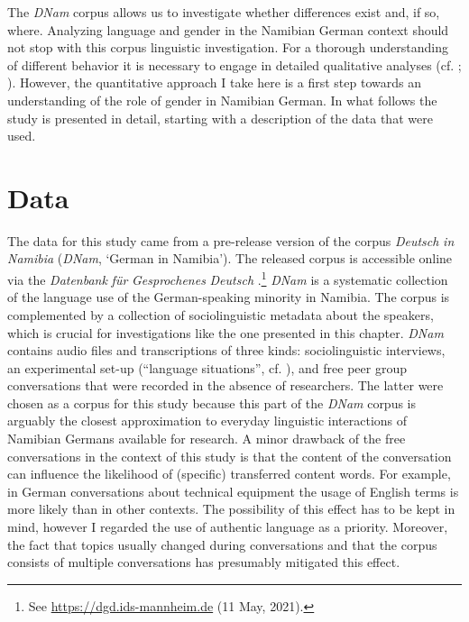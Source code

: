 \documentclass[output=paper]{langsci/langscibook}
\begin{document}
The \textit{DNam} corpus allows us to investigate whether differences exist and, if so, where. Analyzing language and gender in the Namibian German context should not stop with this corpus linguistic investigation. For a thorough understanding of different behavior it is necessary to engage in detailed qualitative analyses (cf. \citealt{eckert_new_1999}; \citealt{eckert_three_2012}). However, the quantitative approach I take here is a first step towards an understanding of the role of gender in Namibian German. In what follows the study is presented in detail, starting with a description of the data that were used.

 
\section{Data}
\label{sec:bracke:3}

The data for this study came from a pre-release version of the corpus \textit{Deutsch} \textit{in} \textit{Namibia} (\textit{DNam}, ‘German in Namibia’). The released corpus is accessible online via the \textit{Datenbank} \textit{für} \textit{Gesprochenes} \textit{Deutsch} \citep{zimmer_korpus_2020}.\footnote{See \url{https://dgd.ids-mannheim.de} (11 May, 2021).} \textit{DNam} is a systematic collection of the language use of the German-speaking minority in Namibia. The corpus is complemented by a collection of sociolinguistic metadata about the speakers, which is crucial for investigations like the one presented in this chapter. \textit{DNam} contains audio files and transcriptions of three kinds: sociolinguistic interviews, an experimental set-up (“language situations”, cf. \citealt{wiese_language_2020, wiese_registerdifferenzierung_2021}), and free peer group conversations that were recorded in the absence of researchers. The latter were chosen as a corpus for this study because this part of the \textit{DNam} corpus is arguably the closest approximation to everyday linguistic interactions of Namibian Germans available for research. A minor drawback of the free conversations in the context of this study is that the content of the conversation can influence the likelihood of (specific) transferred content words. For example, in German conversations about technical equipment the usage of English terms is more likely than in other contexts. The possibility of this effect has to be kept in mind, however I regarded the use of authentic language as a priority. Moreover, the fact that topics usually changed during conversations and that the corpus consists of multiple conversations has presumably mitigated this effect.
\end{document}
